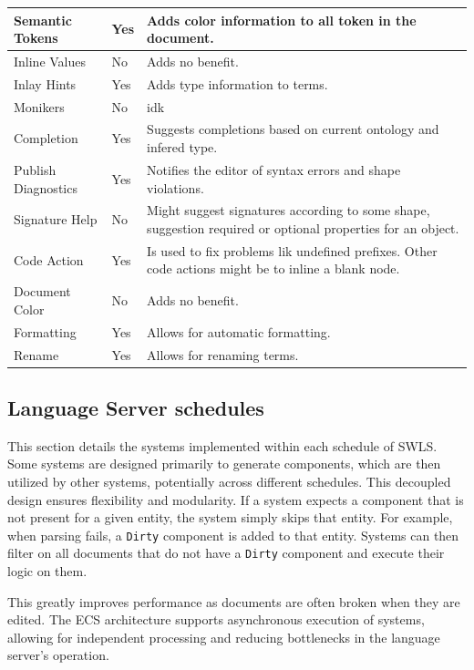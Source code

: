 \begin{table}[ht]
{{\begin{tabular}{||l l l||}
  \hline
  Semantic Tokens & Yes & Adds color information to all token in the document. \\
  \hline
  Inline Values & No & Adds no benefit.\\
  \hline
  Inlay Hints & Yes & Adds type information to terms.\\
  \hline
  Monikers & No & idk \\ 
  \hline
  Completion & Yes & Suggests completions based on current ontology and infered type. \\
  \hline
  Publish Diagnostics & Yes & Notifies the editor of syntax errors and shape violations. \\
  \hline
  Signature Help & No & Might suggest signatures according to some shape, suggestion required or optional properties for an object. \\
  \hline
  Code Action & Yes & Is used to fix problems lik undefined prefixes. Other code actions might be to inline a blank node. \\
  \hline
  Document Color & No & Adds no benefit. \\
  \hline
  Formatting & Yes & Allows for automatic formatting. \\
  \hline
  Rename & Yes & Allows for renaming terms. \\
  \hline
\end{tabular}
  }
  }
\end{table}




\subsection{Language Server schedules}

This section details the systems implemented within each schedule of SWLS.
Some systems are designed primarily to generate components, which are then utilized by other systems, potentially across different schedules.
This decoupled design ensures flexibility and modularity. 
If a system expects a component that is not present for a given entity, the system simply skips that entity.
For example, when parsing fails, a \texttt{Dirty} component is added to that entity.
Systems can then filter on all documents that do not have a \texttt{Dirty} component and execute their logic on them.

This greatly improves performance as documents are often broken when they are edited.
The ECS architecture supports asynchronous execution of systems, allowing for independent processing and reducing bottlenecks in the language server’s operation.

